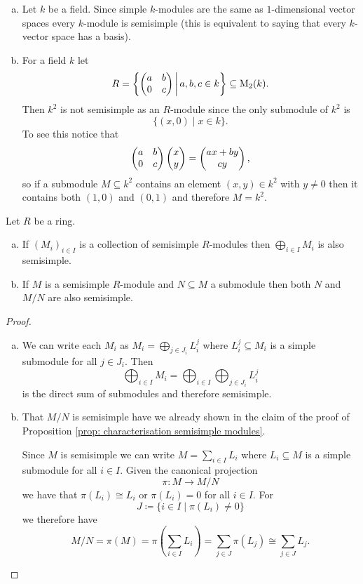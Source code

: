 \begin{expls}
 \begin{enumerate}[a)]
  \item
  Let $k$ be a field. Since simple $k$-modules are the same as $1$-dimensional vector spaces every $k$-module is semisimple (this is equivalent to saying that every $k$-vector space has a basis).
  \item
  For a field $k$ let
  \[
   R = \left\{ \begin{pmatrix}a & b \\ 0 & c\end{pmatrix} \,\middle|\, a, b, c \in k \right\} \subseteq \operatorname{M}_2(k).
  \]
  Then $k^2$ is not semisimple as an $R$-module since the only submodule of $k^2$ is
  \[
   \{ (x,0) \mid x \in k \}.
  \]
  To see this notice that
  \[
   \begin{pmatrix}a & b \\ 0 & c\end{pmatrix} \begin{pmatrix}x \\ y\end{pmatrix} = \begin{pmatrix}ax + by \\ cy\end{pmatrix},
  \]
  so if a submodule $M \subseteq k^2$ contains an element $(x,y) \in k^2$ with $y \neq 0$ then it contains both $(1,0)$ and $(0,1)$ and therefore $M = k^2$.
 \end{enumerate}
\end{expls}


\begin{lem}\label{lem: inherit semisimple}
 Let $R$ be a ring.
 \begin{enumerate}[a)]
  \item
  If $(M_i)_{i \in I}$ is a collection of semisimple $R$-modules then $\bigoplus_{i \in I} M_i$ is also semisimple.
  \item
  If $M$ is a semisimple $R$-module and $N \subseteq M$ a submodule then both $N$ and $M/N$ are also semisimple.
 \end{enumerate}
\end{lem}
\begin{proof}
 \begin{enumerate}[a)]
  \item
  We can write each $M_i$ as $M_i = \bigoplus_{j \in J_i} L^j_i$ where $L^j_i \subseteq M_i$ is a simple submodule for all $j \in J_i$. Then
  \[
   \bigoplus_{i \in I} M_i = \bigoplus_{i \in I} \bigoplus_{j \in J_i} L^j_i
  \]
  is the direct sum of submodules and therefore semisimple.
  \item
  That $M/N$ is semisimple have we already shown in the claim of the proof of Proposition \ref{prop: characterisation semisimple modules}.
  
  Since $M$ is semisimple we can write $M = \sum_{i \in I} L_i$ where $L_i \subseteq M$ is a simple submodule for all $i \in I$. Given the canonical projection
  \[
   \pi \colon M \to M/N
  \]
  we have that $\pi(L_i) \cong L_i$ or $\pi(L_i) = 0$ for all $i \in I$. For
  \[
   J \coloneqq \{i \in I \mid \pi(L_i) \neq 0\}
  \]
  we therefore have
  \[
   M/N = \pi(M) = \pi\left( \sum_{i \in I} L_i \right) = \sum_{j \in J} \pi(L_j) \cong \sum_{j \in J} L_j.
  \]
 \end{enumerate}
\end{proof}


